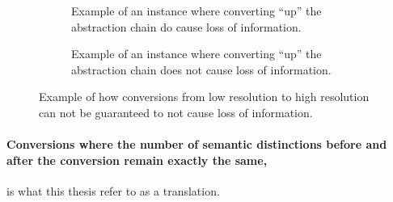 \documentclass{scrreprt}
\begin{document}
\begin{figure}[h]

\begin{subfigure}{.5\textwidth}
  \centering

  \caption{Example of an instance where converting ``up'' the abstraction chain do cause loss of information.}
  \label{fig:low-to-high-resolution-destructive}
\end{subfigure}%
\begin{subfigure}{.5\textwidth}
  \centering

  \caption{Example of an instance where converting ``up'' the abstraction chain does not cause loss of information.}
  \label{fig:low-to-high-resolution-non-destructive}
\end{subfigure}

\caption{Example of how conversions from low resolution to high resolution can not be guaranteed to not cause loss of information.}
\end{figure}


\paragraph{Conversions where the number of semantic distinctions before and after the conversion remain exactly the same,} is what this thesis refer to as a translation. 




\end{document}
